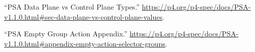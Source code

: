 \documentclass[11pt]{article}
\begin{document}
{{\begin{thebibliography}{39}
\mdbibitemlabel{{}[24]}\textquotedblleft{}PSA Data Plane vs Control Plane Types.\textquotedblright{} \href{https://p4.org/p4-spec/docs/PSA-v1.1.0.html\%23sec-data-plane-vs-control-plane-values}{{\ttfamily https://\hspace{0pt}p4.\hspace{0pt}org/\hspace{0pt}p4-\hspace{0pt}spec/\hspace{0pt}docs/\hspace{0pt}PSA-\hspace{0pt}v1.\hspace{0pt}1.\hspace{0pt}0.\hspace{0pt}html\#\hspace{0pt}sec-\hspace{0pt}data-\hspace{0pt}plane-\hspace{0pt}vs-\hspace{0pt}control-\hspace{0pt}plane-\hspace{0pt}values}}.\label{psatranslation}%

\mdbibitemlabel{{}[25]}\textquotedblleft{}PSA Empty Group Action Appendix.\textquotedblright{} \href{https://p4.org/p4-spec/docs/PSA-v1.1.0.html\%23appendix-empty-action-selector-groups}{{\ttfamily https://\hspace{0pt}p4.\hspace{0pt}org/\hspace{0pt}p4-\hspace{0pt}spec/\hspace{0pt}docs/\hspace{0pt}PSA-\hspace{0pt}v1.\hspace{0pt}1.\hspace{0pt}0.\hspace{0pt}html\#\hspace{0pt}appendix-\hspace{0pt}empty-\hspace{0pt}action-\hspace{0pt}selector-\hspace{0pt}groups}}.\label{psaemptygroupactionappendix}%


\end{thebibliography}}}
\end{document}
